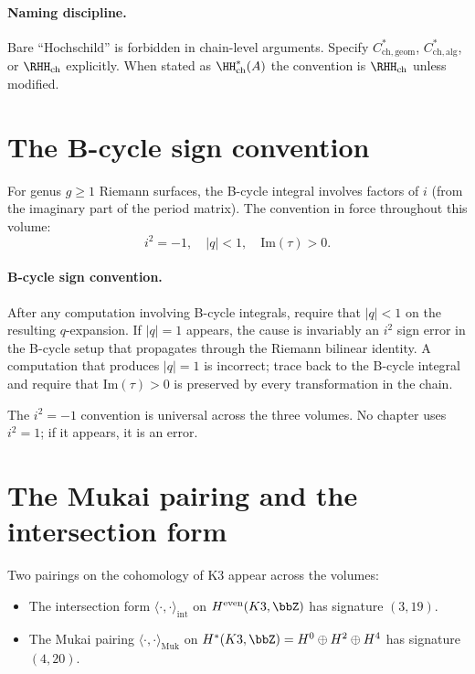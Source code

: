 \paragraph{Naming discipline.}
Bare ``Hochschild'' is forbidden in chain-level arguments. Specify
$C^{*}_{\mathrm{ch,geom}}$, $C^{*}_{\mathrm{ch,alg}}$, or
$\RHH_{\mathrm{ch}}$ explicitly. When stated as
$\HH_{\mathrm{ch}}^*(A)$ the convention is $\RHH_{\mathrm{ch}}$ unless
modified.


\section{The B-cycle sign convention}
\label{sec:b-cycle-sign}

For genus $g \geq 1$ Riemann surfaces, the B-cycle integral involves factors
of $i$ (from the imaginary part of the period matrix). The convention in
force throughout this volume:
\[
 \boxed{\;i^2 = -1,\quad |q| < 1,\quad \mathrm{Im}(\tau) > 0.\;}
\]

\paragraph{B-cycle sign convention.}
After any computation involving B-cycle integrals, require that
$|q| < 1$ on the resulting $q$-expansion. If $|q| = 1$ appears, the cause
is invariably an $i^2$ sign error in the B-cycle setup that propagates
through the Riemann bilinear identity. A computation that produces
$|q| = 1$ is incorrect; trace back to the B-cycle integral and require that
$\mathrm{Im}(\tau) > 0$ is preserved by every transformation in the chain.

The $i^2 = -1$ convention is universal across the three volumes. No
chapter uses $i^2 = 1$; if it appears, it is an error.


\section{The Mukai pairing and the intersection form}
\label{sec:mukai-vs-intersection}

Two pairings on the cohomology of K3 appear across the volumes:
\begin{itemize}
 \item The intersection form $\langle \cdot, \cdot \rangle_{\mathrm{int}}$
 on $H^{\mathrm{even}}(K3, \bbZ)$ has signature $(3, 19)$.
 \item The Mukai pairing $\langle \cdot, \cdot \rangle_{\mathrm{Muk}}$ on
 $H^{*}(K3, \bbZ) = H^0 \oplus H^2 \oplus H^4$ has signature
 $(4, 20)$.
\end{itemize}

